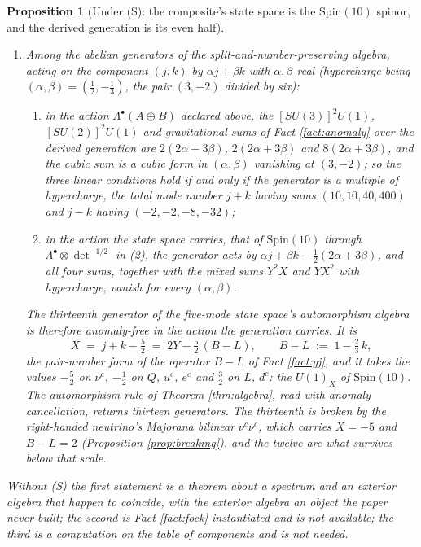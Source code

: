 \documentclass[11pt]{article}
\newtheorem{proposition}[theorem]{Proposition}
\theoremstyle{definition}
\begin{document}
\begin{proposition}[Under (S): the composite's state space is the $\mathrm{Spin}(10)$ spinor, and the derived generation is its even half]
\begin{enumerate}
\item Among the abelian generators of the split-and-number-preserving algebra, acting on the component $(j,k)$ by $\alpha j + \beta k$ with $\alpha, \beta$ real (hypercharge being $(\alpha, \beta) = (\tfrac12, -\tfrac13)$, the pair $(3,-2)$ divided by six):
\begin{enumerate}
\item[(a)] in the action $\Lambda^{\bullet}(A \oplus B)$ declared above, the $[SU(3)]^{2}U(1)$, $[SU(2)]^{2}U(1)$ and gravitational sums of Fact \ref{fact:anomaly} over the derived generation are $2(2\alpha + 3\beta)$, $2(2\alpha + 3\beta)$ and $8(2\alpha + 3\beta)$, and the cubic sum is a cubic form in $(\alpha, \beta)$ vanishing at $(3,-2)$; so the three linear conditions hold if and only if the generator is a multiple of hypercharge, the total mode number $j + k$ having sums $(10, 10, 40, 400)$ and $j - k$ having $(-2, -2, -8, -32)$;
\item[(b)] in the action the state space carries, that of $\mathrm{Spin}(10)$ through $\Lambda^{\bullet} \otimes \det^{-1/2}$ in (2), the generator acts by $\alpha j + \beta k - \tfrac12(2\alpha + 3\beta)$, and all four sums, together with the mixed sums $Y^{2}X$ and $YX^{2}$ with hypercharge, vanish for every $(\alpha, \beta)$.
\end{enumerate}
The thirteenth generator of the five-mode state space's automorphism algebra is therefore anomaly-free in the action the generation carries. It is
\[
X \;=\; j + k - \tfrac52 \;=\; 2Y - \tfrac52\,(B - L), \qquad B - L \;:=\; 1 - \tfrac23\,k,
\]
the pair-number form of the operator $B - L$ of Fact \ref{fact:gj}, and it takes the values $-\tfrac52$ on $\nu^{c}$, $-\tfrac12$ on $Q$, $u^{c}$, $e^{c}$ and $\tfrac32$ on $L$, $d^{c}$: the $U(1)_{X}$ of $\mathrm{Spin}(10)$. The automorphism rule of Theorem \ref{thm:algebra}, read with anomaly cancellation, returns thirteen generators. The thirteenth is broken by the right-handed neutrino's Majorana bilinear $\nu^{c}\nu^{c}$, which carries $X = -5$ and $B - L = 2$ (Proposition \ref{prop:breaking}), and the twelve are what survives below that scale.
\end{enumerate}
Without (S) the first statement is a theorem about a spectrum and an exterior algebra that happen to coincide, with the exterior algebra an object the paper never built; the second is Fact \ref{fact:fock} instantiated and is not available; the third is a computation on the table of components and is not needed.
\end{proposition}
\end{document}
